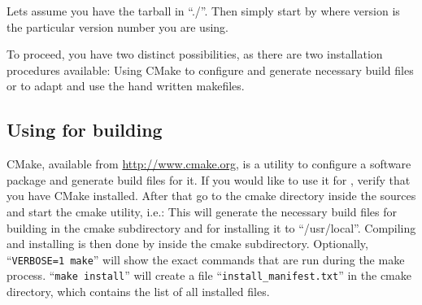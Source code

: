 Lets assume you have the \icewing{} tarball in ``./''. Then simply
start by
\sS
{}
\sE
where version is the particular \icewing{} version number you are
using.

To proceed, you have two distinct possibilities, as there are two
installation procedures available: Using CMake to configure
\icewing{} and generate necessary build files or to adapt and use
the hand written makefiles.

\subsection{Using  for \icewing{} building}

CMake, available from \url{http://www.cmake.org}, is a utility to
configure a software package and generate build files for it. If you
would like to use it for \icewing{}, verify that you have CMake
installed. After that go to the cmake directory inside the
\icewing{} sources and start the cmake utility, i.e.:
\sS
{}
\sE
This will generate the necessary build files for building \icewing{}
in the cmake subdirectory and for installing it to
``/usr/local''. Compiling and installing is then done by
\sS
{}
\sE
inside the cmake subdirectory. Optionally, ``\verb|VERBOSE=1 make|''
will show the exact commands that are run during the make
process. ``\verb|make install|'' will create a file
``\verb|install_manifest.txt|'' in the cmake directory, which
contains the list of all installed files.

